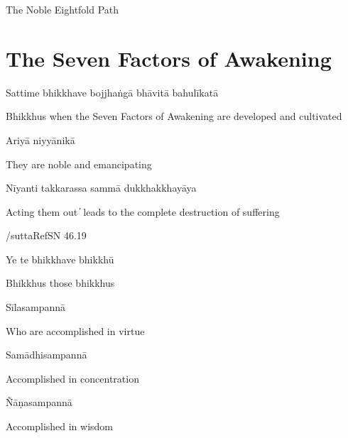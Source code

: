 \begin{cprenglish}
  The Noble Eightfold Path
\end{cprenglish}


\clearpage

\section{The Seven Factors of Awakening}

\begin{leader}
\end{leader}

Sattime bhikkhave bojjhaṅgā bhāvitā bahulīkatā

\begin{cprenglish}
  Bhikkhus when the Seven Factors of Awakening are developed and cultivated
\end{cprenglish}

Ariyā niyyānikā

\begin{cprenglish}
  They are noble and emancipating
\end{cprenglish}

Nīyanti takkarassa sammā dukkhakkhayāya

\begin{cprenglish}
  Acting them out  ̓  leads to the complete destruction of suffering
\end{cprenglish}

/suttaRef{SN 46.19}

Ye te bhikkhave bhikkhū

\begin{cprenglish}
  Bhikkhus those bhikkhus
\end{cprenglish}

Sīlasampannā

\begin{cprenglish}
  Who are accomplished in virtue
\end{cprenglish}

Samādhisampannā

\begin{cprenglish}
  Accomplished in concentration
\end{cprenglish}

Ñāṇasampannā

\begin{cprenglish}
  Accomplished in wisdom
\end{cprenglish}

